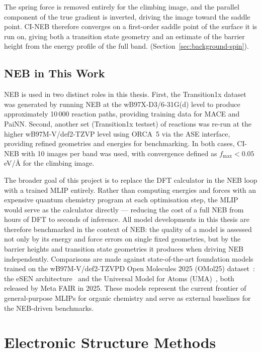 The spring force is removed entirely for the climbing image, and the parallel
component of the true gradient is inverted, driving the image toward the saddle
point. CI-NEB therefore converges on a first-order saddle point of the surface it
is run on, giving both a transition state geometry and an estimate of the barrier
height from the energy profile of the full band. 
(Section~\ref{sec:background-spin}).

\subsection{NEB in This Work}

NEB is used in two distinct roles in this thesis. First, the Transition1x dataset
was generated by running NEB at the \mbox{wB97X-D3/6-31G(d)} level to produce
approximately 10\,000 reaction paths, providing training data for MACE and PaiNN.
Second, another set (Transition1x testset) of reactions was re-run at the higher
\mbox{wB97M-V/def2-TZVP} level using ORCA~5 via the ASE interface, providing
refined geometries and energies for benchmarking. In both cases, CI-NEB with 10
images per band was used, with convergence defined as $f_\text{max} <
0.05$\,eV/\AA{} for the climbing image.

The broader goal of this project is to replace the DFT calculator in the NEB loop
with a trained MLIP entirely. Rather than computing energies and forces with an
expensive quantum chemistry program at each optimisation step, the MLIP would serve
as the calculator directly --- reducing the cost of a full NEB from hours of DFT to
seconds of inference. All model developments in this thesis are therefore benchmarked
in the context of NEB: the quality of a model is assessed not only by its energy and
force errors on single fixed geometries, but by the barrier heights and transition state
geometries it produces when driving NEB independently. Comparisons are made against
state-of-the-art foundation models trained on the \mbox{wB97M-V/def2-TZVPD}
Open Molecules 2025 (OMol25) dataset~\cite{omol25}: the eSEN
architecture~\cite{esen} and the Universal Model for Atoms
(UMA)~\cite{uma}, both released by Meta FAIR in 2025. These models represent the
current frontier of general-purpose MLIPs for organic chemistry and serve as
external baselines for the NEB-driven benchmarks.

\section{Electronic Structure Methods}
\label{sec:background-electronic}


